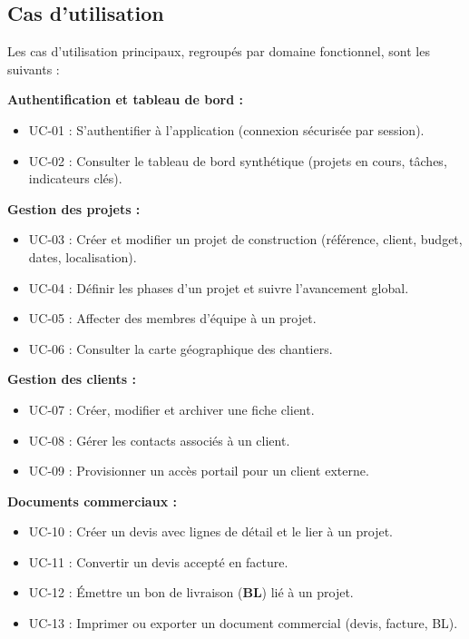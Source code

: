 \subsection{Cas d'utilisation}

Les cas d'utilisation principaux, regroupés par domaine fonctionnel, sont les suivants :

\textbf{Authentification et tableau de bord :}
\begin{itemize}
  \item UC-01 : S'authentifier à l'application (connexion sécurisée par session).
  \item UC-02 : Consulter le tableau de bord synthétique (projets en cours, tâches,
  indicateurs clés).
\end{itemize}

\textbf{Gestion des projets :}
\begin{itemize}
  \item UC-03 : Créer et modifier un projet de construction (référence, client, budget,
  dates, localisation).
  \item UC-04 : Définir les phases d'un projet et suivre l'avancement global.
  \item UC-05 : Affecter des membres d'équipe à un projet.
  \item UC-06 : Consulter la carte géographique des chantiers.
\end{itemize}

\textbf{Gestion des clients :}
\begin{itemize}
  \item UC-07 : Créer, modifier et archiver une fiche client.
  \item UC-08 : Gérer les contacts associés à un client.
  \item UC-09 : Provisionner un accès portail pour un client externe.
\end{itemize}

\textbf{Documents commerciaux :}
\begin{itemize}
  \item UC-10 : Créer un devis avec lignes de détail et le lier à un projet.
  \item UC-11 : Convertir un devis accepté en facture.
  \item UC-12 : Émettre un bon de livraison (\textbf{BL}) lié à un projet.
  \item UC-13 : Imprimer ou exporter un document commercial (devis, facture, BL).
\end{itemize}

